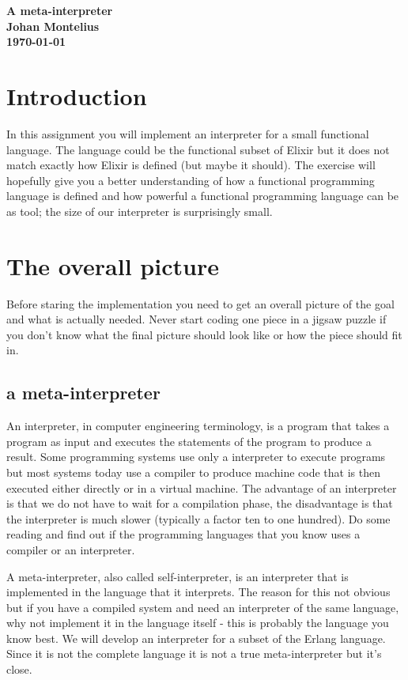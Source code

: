 \documentclass[a4paper,11pt]{article}
\newcommand{\nnsection}[1]{
\section*{#1}
\addcontentsline{toc}{section}{#1}
}
\begin{document}
\begin{center}\vspace{20pt}
\textbf{\large A meta-interpreter}\\
\vspace{10pt}
\textbf{Johan Montelius}\\ 
\vspace{10pt}
\textbf{\today}
\end{center}

\nnsection{Introduction}

In this assignment you will implement an interpreter for a small
functional language. The language could be the functional subset of
Elixir but it does not match exactly how Elixir is defined (but maybe
it should). The exercise will hopefully give you a better
understanding of how a functional programming language is defined and
how powerful a functional programming language can be as tool; the
size of our interpreter is surprisingly small.

\section{The overall picture}

Before staring the implementation you need to get an overall picture
of the goal and what is actually needed. Never start coding one piece
in a jigsaw puzzle if you don't know what the final picture should look
like or how the piece should fit in.

\subsection{a meta-interpreter}

An interpreter, in computer engineering terminology, is a program that
takes a program as input and executes the statements of the program to
produce a result. Some programming systems use only a interpreter to
execute programs but most systems today use a compiler to produce
machine code that is then executed either directly or in a
virtual machine. The advantage of an interpreter is that we do not
have to wait for a compilation phase, the disadvantage is that the
interpreter is much slower (typically a factor ten to one hundred).
Do some reading and find out if the programming languages that you
know uses a compiler or an interpreter.

A meta-interpreter, also called self-interpreter, is an interpreter
that is implemented in the language that it interprets. The reason for
this not obvious but if you have a compiled system and need an
interpreter of the same language, why not implement it in the language
itself - this is probably the language you know best. We will develop
an interpreter for a subset of the Erlang language. Since it is not the
complete language it is not a true meta-interpreter but it's close.
\end{document}
